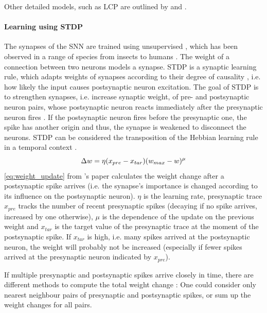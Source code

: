 Other detailed models, such as \ac{LCP} are outlined by \authorsSynapticPlasticity{} \cite{Synaptic_plasticity} 
and \authorssimulationSTDP{} \cite{simulation_STDP}.

\vspace{-3mm}
\paragraph{\textbf{Learning using \ac{STDP}}}
The synapses of the \ac{SNN} are trained using unsupervised , which has been observed in a range of species from insects to humans \cite{STDP_hebbian}. 
The weight of a connection between two neurons models a synapse.
\ac{STDP} is a synaptic learning rule, which adapts weights of synapses according to their degree of causality \cite{STDP_like,multi_scale_STDP},
 i.e. how likely the input causes postsynaptic neuron excitation.
The goal of \ac{STDP} is to strengthen synapses, i.e. increase synaptic weight, of pre- and postsynaptic neuron pairs, 
whose postsynaptic neuron reacts immediately after the presynaptic neuron fires \cite{object_detection_SNN}.
If the postsynaptic neuron fires before the presynaptic one, the spike has another origin and thus, the synapse is weakened to disconnect the neurons.
\ac{STDP} can be considered the transposition of the Hebbian learning rule in a temporal context \cite{STDP_vis_feat}.
%
\begin{equation}
    \centering
    \label{eq:weight_update}
    \Delta w = \eta (x_{pre} - x_{tar})(w_{max}-w)^\mu
\end{equation}
%
\autoref{eq:weight_update} from \authorsSNN{}'s paper \cite{SNN} calculates the weight change after a postsynaptic spike arrives 
(i.e. the synapse's importance is changed according to its influence on the postsynaptic neuron).
$\eta$ is the learning rate, presynaptic trace $x_{pre}$ tracks the number of recent presynaptic spikes 
(decaying if no spike arrives, increased by one otherwise), 
$\mu$ is the dependence of the update on the previous weight and 
$x_{tar}$ is the target value of the presynaptic trace at the moment of the postsynaptic spike.
If $x_{tar}$ is high, i.e. many spikes arrived at the postsynaptic neuron, the weight will probably not be increased 
(especially if fewer spikes arrived at the presynaptic neuron indicated by  $x_{pre}$).

If multiple presynaptic and postsynaptic spikes arrive closely in time, there are different methods to compute the total weight change \cite{simulation_STDP}:
One could consider only nearest neighbour pairs of presynaptic and postsynaptic spikes, or sum up the weight changes for all pairs.

